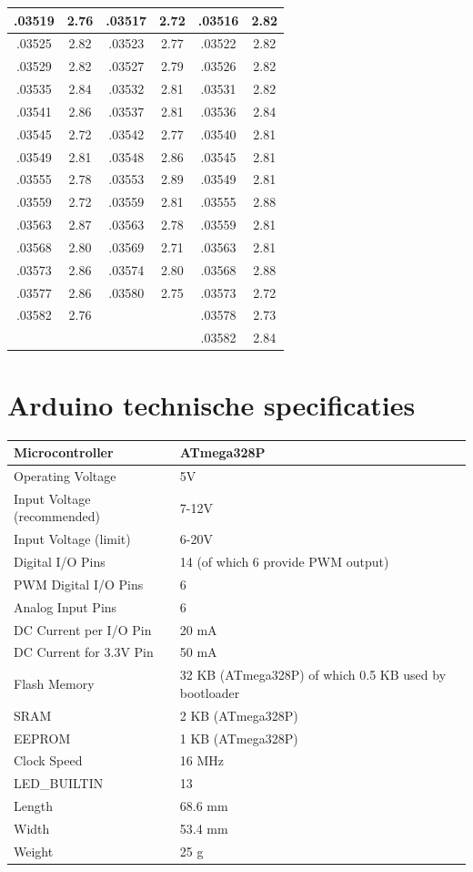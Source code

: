 \documentclass[10pt,twoside]{report}
\begin{document}
\begin{appendices}
\begin{longtable}{|c|c||c|c||c|c|}
.03519 & 2.76 & .03517 & 2.72 & .03516 & 2.82\\\hline
.03525 & 2.82 & .03523 & 2.77 & .03522 & 2.82\\\hline
.03529 & 2.82 & .03527 & 2.79 & .03526 & 2.82\\\hline
.03535 & 2.84 & .03532 & 2.81 & .03531 & 2.82\\\hline
.03541 & 2.86 & .03537 & 2.81 & .03536 & 2.84\\\hline
.03545 & 2.72 & .03542 & 2.77 & .03540 & 2.81\\\hline
.03549 & 2.81 & .03548 & 2.86 & .03545 & 2.81\\\hline
.03555 & 2.78 & .03553 & 2.89 & .03549 & 2.81\\\hline
.03559 & 2.72 & .03559 & 2.81 & .03555 & 2.88\\\hline
.03563 & 2.87 & .03563 & 2.78 & .03559 & 2.81\\\hline
.03568 & 2.80 & .03569 & 2.71 & .03563 & 2.81\\\hline
.03573 & 2.86 & .03574 & 2.80 & .03568 & 2.88\\\hline
.03577 & 2.86 & .03580 & 2.75 & .03573 & 2.72\\\hline
.03582 & 2.76 &  & & .03578 & 2.73\\\hline
 & &  & & .03582 & 2.84\\\hline
\end{longtable}

\chapter{Arduino technische specificaties}
\begin{tabular}{|l|l|}
    \hline
Microcontroller & ATmega328P\\\hline
Operating Voltage & 5V\\\hline
Input Voltage (recommended) & 7-12V\\\hline
Input Voltage (limit) & 6-20V\\\hline
Digital I/O Pins & 14 (of which 6 provide PWM output)\\\hline
PWM Digital I/O Pins & 6\\\hline
Analog Input Pins &	6\\\hline
DC Current per I/O Pin & 20 mA\\\hline
DC Current for 3.3V Pin & 50 mA\\\hline
Flash Memory & 32 KB (ATmega328P) of which 0.5 KB used by bootloader\\\hline
SRAM & 2 KB (ATmega328P)\\\hline
EEPROM & 1 KB (ATmega328P)\\\hline
Clock Speed & 16 MHz\\\hline
LED\_BUILTIN & 13\\\hline
Length & 68.6 mm\\\hline
Width & 53.4 mm\\\hline
Weight & 25 g\\\hline
\end{tabular}


\end{appendices}
\end{document}
